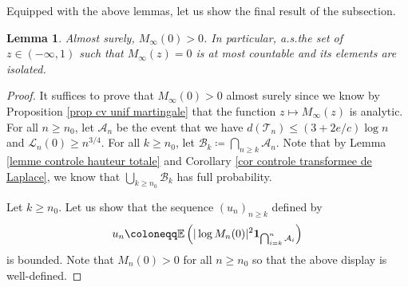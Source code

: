 \documentclass[11pt]{article}
\newtheorem{lemma}[theorem]{Lemma}
\numberwithin{equation}{section}
\def \T{\mathcal{T}}
\def \cL{\mathcal{L}}
\def\E{\mathbb{E}}
\begin{document}
Equipped with the above lemmas, let us show the final result of the subsection.
\begin{lemma}\label{lemme limite non nulle}
	Almost surely, $M_\infty(0)> 0$. In particular, a.s.\@ the set of $z \in (-\infty, 1)$ such that $M_\infty(z) =0$ is at most countable and its elements are isolated.
\end{lemma}
\begin{proof}
	It suffices to prove that $M_\infty(0)> 0$ almost surely since we know by Proposition \ref{prop cv unif martingale} that the function $z \mapsto M_\infty(z)$ is analytic. For all $n\ge n_0$, let $\mathcal{A}_n$ be the event that we have $d(\T_n)\le (3+2e/c)\log n$ and $\cL_n(0) \ge n^{3/4}$. For all $k\ge n_0$, let $\mathcal{B}_k \coloneqq \bigcap_{n\ge k} \mathcal{A}_n$. Note that by Lemma \ref{lemme controle hauteur totale} and Corollary \ref{cor controle transformee de Laplace}, we know that $\bigcup_{k\ge n_0}\mathcal{B}_k$ has full probability.
	
	Let $k\ge n_0$. Let us show that the sequence $(u_n)_{n\ge k}$ defined by
	\[
	u_n\coloneqq \E\left(\vert \log M_n(0)\vert^2 {\bf 1}_{\bigcap_{i=k}^n \mathcal{A}_i}\right)
	\]
	is bounded. Note that $M_n(0)>0$ for all $n\ge n_0$ so that the above display is well-defined.
	

\end{proof}
\end{document}
